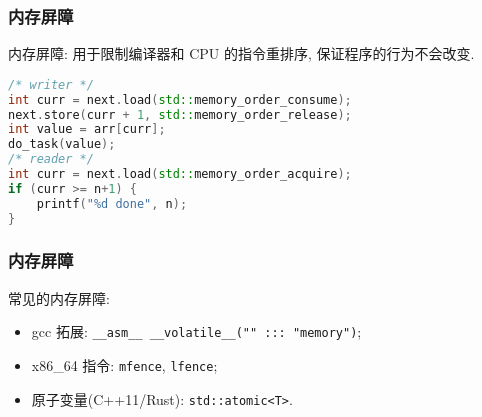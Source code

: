 \documentclass{ctexbeamer}
\newcommand{\ftitle}[1]{\frametitle{\hspace{4ex} {#1}}}
\begin{document}
\begin{frame}[fragile]
    \ftitle{内存屏障}
     内存屏障: 用于限制编译器和 CPU 的指令重排序,
    保证程序的行为不会改变.
    \begin{lstlisting}[language=c++]
/* writer */
int curr = next.load(std::memory_order_consume);
next.store(curr + 1, std::memory_order_release);
int value = arr[curr];
do_task(value);
/* reader */
int curr = next.load(std::memory_order_acquire);
if (curr >= n+1) {
    printf("%d done", n);
}
    \end{lstlisting}
\end{frame}

\begin{frame}
    \ftitle{内存屏障}
    常见的内存屏障:
    \begin{itemize}
        \item<1- > gcc 拓展: \texttt{__asm__ __volatile__("" ::: "memory")};
        \item<2- > x86_64 指令: \texttt{mfence}, \texttt{lfence};
        \item<3- > 原子变量(C++11/Rust): \texttt{std::atomic<T>}.
    \end{itemize}
\end{frame}
\end{document}
